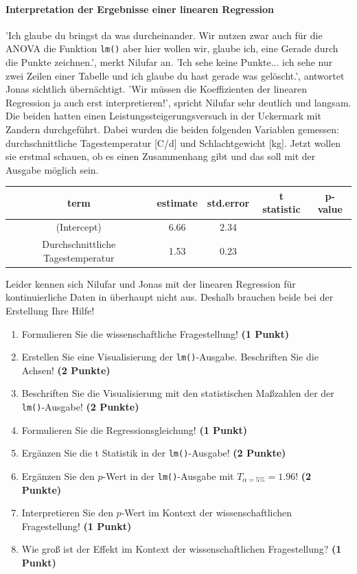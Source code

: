 \documentclass[a4paper, 9pt]{scrartcl}\usepackage[]{graphicx}\usepackage[]{xcolor}
\begin{document}
\paragraph{Interpretation der Ergebnisse einer linearen Regression}


'Ich glaube du bringst da was durcheinander. Wir nutzen zwar auch für die ANOVA die Funktion \texttt{lm()} aber hier wollen wir, glaube ich, eine Gerade durch die Punkte zeichnen.', merkt Nilufar an. 'Ich sehe keine Punkte... ich sehe nur zwei Zeilen einer Tabelle und ich glaube du hast gerade was gelöscht.', antwortet Jonas sichtlich übernächtigt. 'Wir müssen die Koeffizienten der linearen Regression ja auch erst interpretieren!', spricht Nilufar sehr deutlich und langsam. Die beiden hatten einen Leistungssteigerungsversuch in der Uckermark mit Zandern durchgeführt. Dabei wurden die beiden folgenden Variablen gemessen: durchschnittliche Tagestemperatur [C/d] und Schlachtgewicht [kg]. Jetzt wollen sie erstmal schauen, ob es einen Zusammenhang gibt und das soll mit der \Rlogo Ausgabe möglich sein.

\begin{table}[!h]
\centering\begingroup\fontsize{11}{13}\selectfont

\begin{tabular}{ccccc}
\toprule
term & estimate & std.error & t statistic & p-value\\
\midrule
(Intercept) & 6.66 & 2.34 &  & \\
Durchschnittliche Tagestemperatur & 1.53 & 0.23 &  & \\
\bottomrule
\end{tabular}
\endgroup{}
\end{table}



Leider kennen sich Nilufar und Jonas mit der linearen Regression für kontinuierliche Daten in \Rlogo überhaupt nicht aus. Deshalb brauchen beide bei der Erstellung Ihre Hilfe!

\begin{enumerate}
\item Formulieren Sie die wissenschaftliche Fragestellung! \textbf{(1 Punkt)}
\item Erstellen  Sie  eine  Visualisierung  der \texttt{lm()}-Ausgabe.  Beschriften  Sie  die  Achsen! \textbf{(2 Punkte)}
\item Beschriften Sie die Visualisierung mit den statistischen Maßzahlen der der \texttt{lm()}-Ausgabe! \textbf{(2 Punkte)}
\item Formulieren Sie die Regressionsgleichung! \textbf{(1 Punkt)}
\item Ergänzen Sie die t Statistik in der \texttt{lm()}-Ausgabe! \textbf{(2 Punkte)}
\item Ergänzen Sie den $p$-Wert in der \texttt{lm()}-Ausgabe mit $T_{\alpha = 5\%} = 1.96$!  \textbf{(2 Punkte)}
\item Interpretieren Sie den $p$-Wert im Kontext der wissenschaftlichen Fragestellung! \textbf{(1 Punkt)}  
\item Wie groß ist der Effekt im Kontext der wissenschaftlichen Fragestellung? \textbf{(1 Punkt)}
\end{enumerate} 
\clearpage
\end{document}
